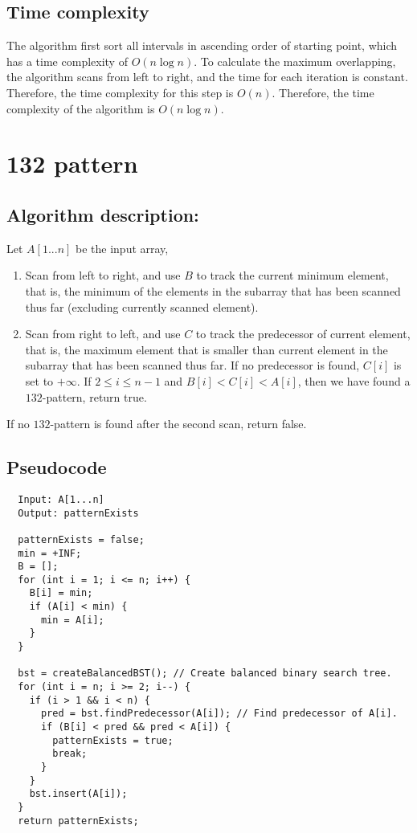 \documentclass[paper=a4, fontsize=11pt]{scrartcl} %
\numberwithin{equation}{section} %
\numberwithin{figure}{section} %
\numberwithin{table}{section} %
\numberwithin{claimcounter}{section}
\begin{document}
\subsection*{Time complexity}
The algorithm first sort all intervals in ascending order of starting point,
which has a time complexity of $O(n\log n)$. To calculate the maximum
overlapping, the algorithm scans from left to right, and the time for each
iteration is constant. Therefore, the time complexity for this step is $O(n)$.
Therefore, the time complexity of the algorithm is $O(n\log n)$.

\section{132 pattern}
\subsection*{Algorithm description:}
Let $A[1...n]$ be the input array,
\begin{enumerate}
\item Scan from left to right, and use $B$ to track the current minimum element,
that is, the minimum of the elements in the subarray that has been scanned thus 
far (excluding currently scanned element).

\item Scan from right to left, and use $C$ to track the predecessor of current
element, that is, the maximum element that is smaller than current element in
the subarray that has been scanned thus far. If no predecessor is found, $C[i]$
is set to $+\infty$. If $2 \leq i \leq n-1$ and $B[i] < C[i] < A[i]$, then we have found a
$132$-pattern, return true. 

\end{enumerate}
If no $132$-pattern is found after the second scan, return false.

\subsection*{Pseudocode}
\begin{verbatim}
  Input: A[1...n]
  Output: patternExists
  
  patternExists = false;
  min = +INF;
  B = [];
  for (int i = 1; i <= n; i++) {
    B[i] = min;
    if (A[i] < min) {
      min = A[i];
    }
  }
  
  bst = createBalancedBST(); // Create balanced binary search tree.
  for (int i = n; i >= 2; i--) {
    if (i > 1 && i < n) {
      pred = bst.findPredecessor(A[i]); // Find predecessor of A[i].
      if (B[i] < pred && pred < A[i]) {
        patternExists = true;
        break;
      }
    }
    bst.insert(A[i]);
  }
  return patternExists;
\end{verbatim}
\end{document}
